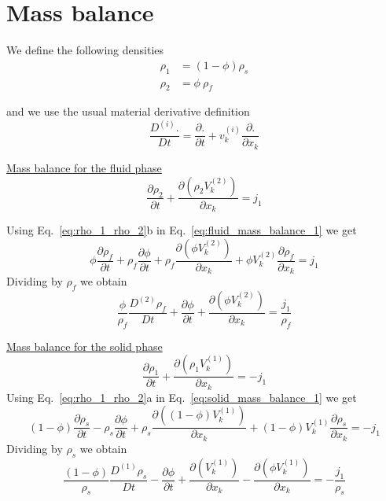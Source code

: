 \documentclass[]{scrreprt}
\begin{document}
\section{Mass balance}
\label{sec:mass_balance}
We define the following densities
\begin{subequations}
  \label{eq:rho_1_rho_2}
  \begin{align}
    \rho_1 &= (1-\phi)\rho_s \\
    \rho_2 &= \phi \: \rho_f  
  \end{align}
\end{subequations}

and we use the usual material derivative definition
\begin{equation}
  \label{eq:material_derivative}
  \frac{D^{(i)}.}{D t} = \frac{\partial.}{\partial t} + v^{(i)}_k \frac{\partial.}{\partial x_k}
\end{equation}


\underline{Mass balance for the fluid phase}
\begin{equation}
  \label{eq:fluid_mass_balance_1}
  \frac{\partial \rho_2}{\partial t} + \frac{\partial( \rho_2 V^{(2)}_k)}{\partial x_k}= j_1
\end{equation}

Using Eq.~\ref{eq:rho_1_rho_2}b in Eq.~\ref{eq:fluid_mass_balance_1} we get
\begin{equation}
  \label{eq:fluid_mass_balance_2}
  \phi \frac{\partial \rho_f }{\partial t} + \rho_f\frac{\partial \phi }{\partial t} + \rho_f\frac{\partial( \phi V^{(2)}_k)}{\partial x_k}+ \phi V^{(2)}_k\frac{\partial\rho_f}{\partial x_k} = j_1
\end{equation}
Dividing by $\rho_f$ we obtain
\begin{equation}
  \label{eq:fluid_mass_balance}
  \frac{\phi}{\rho_f} \frac{D^{(2)} \rho_f }{D t} + \frac{\partial \phi }{\partial t} + \frac{\partial( \phi V^{(2)}_k)}{\partial x_k} = \frac{j_1}{\rho_f}
\end{equation}


\underline{Mass balance for the solid phase}
\begin{equation}
  \label{eq:solid_mass_balance_1}
  \frac{\partial \rho_1}{\partial t} + \frac{\partial( \rho_1 V^{(1)}_k)}{\partial x_k}= -j_1
\end{equation}
Using Eq.~\ref{eq:rho_1_rho_2}a in Eq.~\ref{eq:solid_mass_balance_1} we get
\begin{equation}
  \label{eq:solid_mass_balance_2}
  (1-\phi) \frac{\partial \rho_s }{\partial t} - \rho_s\frac{\partial \phi }{\partial t} + \rho_s\frac{\partial( (1-\phi) V^{(1)}_k)}{\partial x_k}+ (1-\phi) V^{(1)}_k\frac{\partial\rho_s}{\partial x_k} = -j_1
\end{equation}
Dividing by $\rho_s$ we obtain
\begin{equation}
  \label{eq:solid_mass_balance}
  \frac{(1-\phi)}{\rho_s} \frac{D^{(1)} \rho_s }{D t} - \frac{\partial \phi }{\partial t} + \frac{\partial(V^{(1)}_k)}{\partial x_k} - \frac{\partial( \phi V^{(1)}_k)}{\partial x_k} = -\frac{j_1}{\rho_s}
\end{equation}
\end{document}
